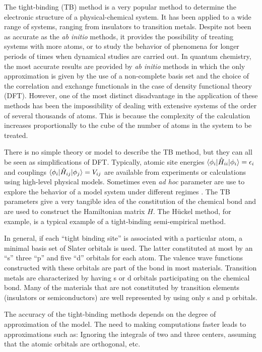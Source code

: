 The tight-binding (TB) method is a very popular method to determine the electronic structure of a 
physical-chemical system. It has been applied to a wide range of systems, ranging from insulators to
transition metals. Despite not been as accurate as the \textit{ab initio} methods, it provides
the possibility of treating systems with more atoms, or to study the behavior of phenomena
for longer periods of times when dynamical studies are carried out.
%
In quantum chemistry, the most accurate results are provided by \textit{ab initio} methods in which the only approximation is given by the use of a non-complete basis set and the choice of the correlation and exchange functionals in the case of density functional theory (DFT). 
However, one of the most distinct disadvantage in the application of these methods has been
the impossibility of dealing with extensive systems of the order of several thousands of atoms. This is
because the complexity of the calculation increases proportionally to the cube of the number of
atoms in the system to be treated.

There is no simple theory or model to describe the TB method, but they can all be seen as simplifications of 
DFT. Typically, atomic site energies $\langle \phi_i |\hat{H}_{ii}| \phi_i \rangle = \epsilon_i$ and couplings $\langle \phi_i |\hat{H}_{ij}| \phi_j \rangle = V_{ij}$ are available from experiments or calculations using high-level physical models. Sometimes even \textit{ad hoc} parameter are use to explore the behavior of a model system under different regimes \cite{Negre2008-2}. 
%
The TB parameters give a very tangible idea of the constitution of the chemical bond
and are used to construct the Hamiltonian matrix $H$.
The H\"{u}ckel method, for example, is a typical example of a tight-binding semi-empirical method.

In general, if each ``tight binding site'' is associated with a particular atom, a minimal basis set of Slater orbitals is used. The latter constituted at most by an ``s'' three ``p'' and five ``d'' orbitals for each atom. The valence wave functions constructed with
these orbitals are part of the bond in most materials. Transition metals are characterized by having s or d orbitals participating on the chemical bond. Many of the materials that are not constituted by transition elements (insulators or semiconductors)
are well represented by using only s and p orbitals.

The accuracy of the tight-binding methods depends on the degree of approximation of the model.
The need to making computations faster leads to approximations such as: Ignoring the integrals of two and three centers, assuming that the
atomic orbitals are orthogonal, etc.

